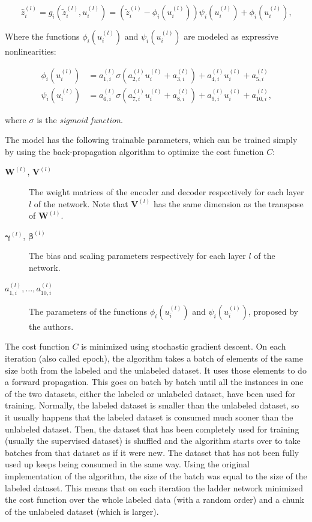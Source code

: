 \[
  \hat{z}^{(l)}_{i} = g_{i}(\tilde{z}^{(l)}_{i}, u^{(l)}_{i}) =
    \left(\tilde{z}^{(l)}_{i} -
    \phi_{i}(u^{(l)}_{i})\right)\psi_{i}(u^{(l)}_{i}) + \phi_{i}(u^{(l)}_{i})
    \text{,}
\]

Where the functions $\phi_{i}(u^{(l)}_{i})$ and $\psi_{i}(u^{(l)}_{i})$ are
modeled as expressive nonlinearities:

\begin{align*}
  \phi_{i}(u^{(l)}_{i}) &= a^{(l)}_{1,i}\sigma(a^{(l)}_{2,i}u^{(l)}_{i} +
    a^{(l)}_{3,i}) + a^{(l)}_{4,i}u^{(l)}_{i} + a^{(l)}_{5,i} \\
  \psi_{i}(u^{(l)}_{i}) &= a^{(l)}_{6,i}\sigma(a^{(l)}_{7,i}u^{(l)}_{i} +
    a^{(l)}_{8,i}) + a^{(l)}_{9,i}u^{(l)}_{i} + a^{(l)}_{10,i}
  \text{,}
\end{align*}

where $\sigma$ is the {\em sigmoid function}.

The model has the following trainable parameters, which can be trained simply
by using the back-propagation algorithm to optimize the cost function $C$:

\begin{description}
  \item[$\mathbf{W}^{(l)}$, $\mathbf{V}^{(l)}$] The weight matrices of the
    encoder and decoder respectively for each layer $l$ of the network. Note
    that $\mathbf{V}^{(l)}$ has the same dimension as the transpose of
    $\mathbf{W}^{(l)}$.
  \item[$\boldsymbol{\gamma}^{(l)}$, $\boldsymbol{\beta}^{(l)}$] The bias and
    scaling parameters respectively for each layer $l$ of the network.
  \item[$a^{(l)}_{1,i},\dots,a^{(l)}_{10,i}$] The parameters of the functions
    $\phi_{i}(u^{(l)}_{i})$ and $\psi_{i}(u^{(l)}_{i})$, proposed by the
    authors.
\end{description}

The cost function $C$ is minimized using stochastic gradient descent. On each
iteration (also called epoch), the algorithm takes a batch of elements of the
same size both from the labeled and the unlabeled dataset. It uses those
elements to do a forward propagation. This goes on batch by batch until all the
instances in one of the two datasets, either the labeled or unlabeled dataset,
have been used for training. Normally, the labeled dataset is smaller than the
unlabeled dataset, so it usually happens that the labeled dataset is consumed
much sooner than the unlabeled dataset. Then, the dataset that has been
completely used for training (usually the supervised dataset) is shuffled and
the algorithm starts over to take batches from that dataset as if it were new.
The dataset that has not been fully used up keeps being consumed in the same
way. Using the original implementation of the algorithm, the size of the batch
was equal to the size of the labeled dataset. This means that on each iteration
the ladder network minimized the cost function over the whole labeled data
(with a random order) and a chunk of the unlabeled dataset (which is larger).

